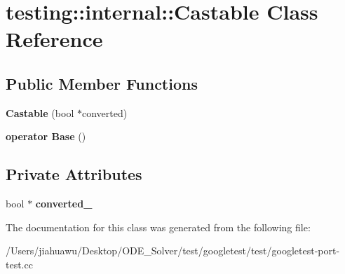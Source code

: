 \hypertarget{classtesting_1_1internal_1_1_castable}{}\section{testing\+:\+:internal\+:\+:Castable Class Reference}
\label{classtesting_1_1internal_1_1_castable}
\subsection*{Public Member Functions}
\begin{DoxyCompactItemize}
\item 
\mbox{\label{classtesting_1_1internal_1_1_castable_a705d519a227d38ff5c174905316f62c4}} 
{\bfseries Castable} (bool $\ast$converted)
\item 
\mbox{\label{classtesting_1_1internal_1_1_castable_ac60b2e7885f3b09defb829eddaa0afd9}} 
{\bfseries operator Base} ()
\end{DoxyCompactItemize}
\subsection*{Private Attributes}
\begin{DoxyCompactItemize}
\item 
\mbox{\label{classtesting_1_1internal_1_1_castable_a25aef3122ad03813a44bb3d40190b490}} 
bool $\ast$ {\bfseries converted\+\_\+}
\end{DoxyCompactItemize}


The documentation for this class was generated from the following file\+:\begin{DoxyCompactItemize}
\item 
/\+Users/jiahuawu/\+Desktop/\+O\+D\+E\+\_\+\+Solver/test/googletest/test/googletest-\/port-\/test.\+cc\end{DoxyCompactItemize}
